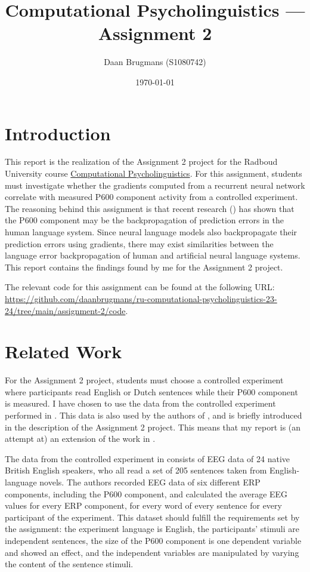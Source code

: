 \documentclass{IEEEtran}
\begin{document}
\title{Computational Psycholinguistics --- Assignment 2}
\author{Daan Brugmans (S1080742)}
\date{\today}

\graphicspath{{./images}}

\maketitle

\section{Introduction}
This report is the realization of the Assignment 2 project for the Radboud University course \href{https://www.ru.nl/courseguides/arts/courses/ma/rema-lc/let-rema-lcex28/}{Computational Psycholinguistics}.
For this assignment, students must investigate whether the gradients computed from a recurrent neural network correlate with measured P600 component activity from a controlled experiment.
The reasoning behind this assignment is that recent research (\cite{fitz2019erp,frank2024gradients}) has shown that the P600 component may be the backpropagation of prediction errors in the human language system.
Since neural language models also backpropagate their prediction errors using gradients, there may exist similarities between the language error backpropagation of human and artificial neural language systems.
This report contains the findings found by me for the Assignment 2 project.

The relevant code for this assignment can be found at the following URL: \url{https://github.com/daanbrugmans/ru-computational-psycholinguistics-23-24/tree/main/assignment-2/code}.

\section{Related Work}
For the Assignment 2 project, students must choose a controlled experiment where participants read English or Dutch sentences while their P600 component is measured.
I have chosen to use the data from the controlled experiment performed in \cite{frank2015erp}.
This data is also used by the authors of \cite{frank2024gradients}, and is briefly introduced in the description of the Assignment 2 project.
This means that my report is (an attempt at) an extension of the work in \cite{frank2024gradients}.

The data from the controlled experiment in \cite{frank2015erp} consists of EEG data of 24 native British English speakers, who all read a set of 205 sentences taken from English-language novels.
The authors recorded EEG data of six different ERP components, including the P600 component, and calculated the average EEG values for every ERP component, for every word of every sentence for every participant of the experiment.
This dataset should fulfill the requirements set by the assignment: the experiment language is English, the participants' stimuli are independent sentences, the size of the P600 component is one dependent variable and showed an effect, and the independent variables are manipulated by varying the content of the sentence stimuli.
\end{document}
